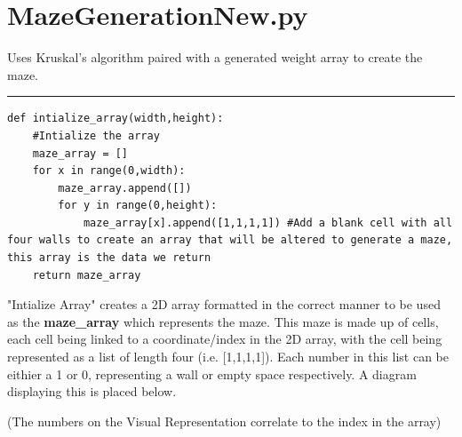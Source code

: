 \documentclass{article}
\begin{document}

\clearpage
\section{MazeGenerationNew.py}
Uses Kruskal’s algorithm paired with a generated weight array to create the maze.

\textcolor[RGB]{220,220,220}{\rule{\linewidth}{0.2pt}}
\begin{lstlisting}
def intialize_array(width,height):
    #Intialize the array
    maze_array = []
    for x in range(0,width):
        maze_array.append([])
        for y in range(0,height):
            maze_array[x].append([1,1,1,1]) #Add a blank cell with all four walls to create an array that will be altered to generate a maze, this array is the data we return
    return maze_array
\end{lstlisting}
"Intialize Array" creates a 2D array formatted in the correct manner to be used as the \textbf{maze\_array} which represents the maze. This maze is made
up of cells, each cell being linked to a coordinate/index in the 2D array, with the cell being represented as a list of length four (i.e. [1,1,1,1]). Each number in
this list can be eithier a 1 or 0, representing a wall or empty space respectively. A diagram displaying this is placed below.
\begin{center}

	\color{mygrey}(The numbers on the Visual Representation correlate to the index in the array)
\end{center}
\end{document}
